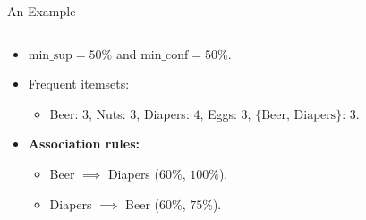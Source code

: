 \begin{frame}{An Example}
\begin{columns}
\begin{column}{0.5\textwidth}
\begin{itemize}
\begin{itemize}
					      \item $\text{min\_sup} = 50\%$ and $\text{min\_conf} =
						            50\%$.
					      \item Frequent itemsets:
					            \begin{itemize}
						            \item Beer: $3$, Nuts: $3$, Diapers: $4$, Eggs: $3$,
						                  $\{\text{Beer, Diapers}\}$: $3$.
					            \end{itemize}
					      \item \textbf{Association rules:}
					            \begin{itemize}
						            \item Beer $\implies$ Diapers ($60\%$, $100\%$).
						            \item Diapers $\implies$ Beer ($60\%$, $75\%$).
					            \end{itemize}
				      \end{itemize}
			\end{itemize}
		\end{column}
	\end{columns}
\end{frame}

